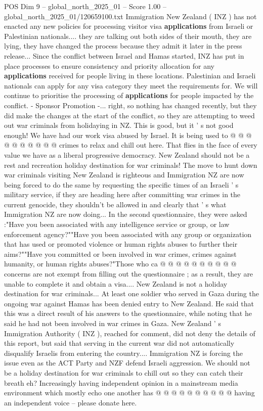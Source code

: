 \begin{textsample}{POS Dim 9 – global\_north\_2025\_01 – Score 1.00 – global\_north\_2025\_01/120659100.txt}  \label{ex:f9_pos_415}
Immigration New Zealand ( INZ ) has not enacted any new policies for processing visitor visa \textbf{applications} from Israeli or Palestinian nationals.... they are talking out both sides of their mouth, they are lying, they have changed the process because they admit it later in the press release...
Since the conflict between Israel and Hamas started, INZ has put in place processes to ensure consistency and priority allocation for any \textbf{applications} received for people living in these locations.
Palestinian and Israeli nationals can apply for any visa category they meet the requirements for.
We will continue to prioritise the processing of \textbf{applications} for people impacted by the conflict. - Sponsor Promotion -... right, so nothing has changed recently, but they did make the changes at the start of the conflict, so they are attempting to weed out war criminals from holidaying in NZ.
This is good, but it ' s not good enough!
We have had our work visa abused by Israel.
It is being used to @ @ @ @ @ @ @ @ @ @ crimes to relax and chill out here.
That flies in the face of every value we have as a liberal progressive democracy.
New Zealand should not be a rest and recreation holiday destination for war criminals!
The move to hunt down war criminals visiting New Zealand is righteous and Immigration NZ are now being forced to do the same by requesting the specific times of an Israeli ' s military service, if they are heading here after committing war crimes in the current genocide, they shouldn't be allowed in and clearly that ' s what Immigration NZ are now doing...
In the second questionnaire, they were asked :"Have you been associated with any intelligence service or group, or law enforcement agency?""Have you been associated with any group or organization that has used or promoted violence or human rights abuses to further their aims?""Have you committed or been involved in war crimes, crimes against humanity, or human rights abuses?"Those who ca @ @ @ @ @ @ @ @ @ @ concerns are not exempt from filling out the questionnaire ; as a result, they are unable to complete it and obtain a visa....
New Zealand is not a holiday destination for war criminals...
At least one soldier who served in Gaza during the ongoing war against Hamas has been denied entry to New Zealand.
He said that this was a direct result of his answers to the questionnaire, while noting that he said he had not been involved in war crimes in Gaza.
New Zealand ' s Immigration Authority ( INZ ), reached for comment, did not deny the details of this report, but said that serving in the current war did not automatically disqualify Israelis from entering the country....
Immigration NZ is forcing the issue even as the ACT Party and NZF defend Israeli aggression.
We should not be a holiday destination for war criminals to chill out so they can catch their breath eh?
Increasingly having independent opinion in a mainstream media environment which mostly echo one another has @ @ @ @ @ @ @ @ @ @ having an independent voice -- please donate here.

\end{textsample}
